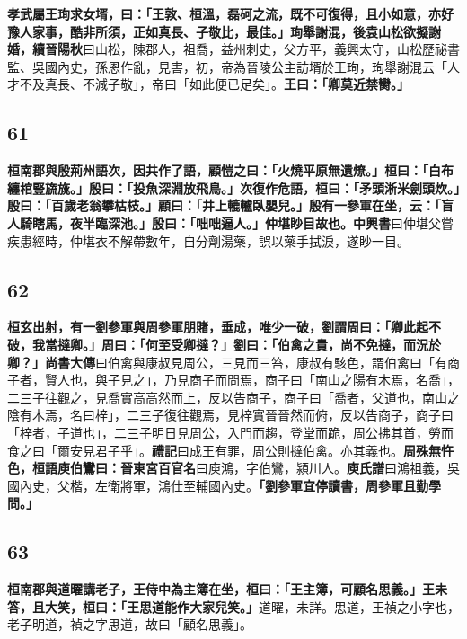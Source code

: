 \textbf{孝武屬王珣求女壻，曰：「王敦、桓溫，磊砢之流，既不可復得，且小如意，亦好豫人家事，酷非所須，正如真長、子敬比，最佳。」珣舉謝混，後袁山松欲擬謝婚，}{\footnotesize \textbf{續晉陽秋}曰山松，陳郡人，祖喬，益州刺史，父方平，義興太守，山松歷祕書監、吳國內史，孫恩作亂，見害，初，帝為晉陵公主訪壻於王珣，珣舉謝混云「人才不及真長、不減子敬」，帝曰「如此便已足矣」。}\textbf{王曰：「卿莫近禁臠。」}

\subsection*{61}

\textbf{桓南郡與殷荊州語次，因共作了語，顧愷之曰：「火燒平原無遺燎。」桓曰：「白布纏棺豎旒旐。」殷曰：「投魚深淵放飛鳥。」次復作危語，桓曰：「矛頭淅米劍頭炊。」殷曰：「百歲老翁攀枯枝。」顧曰：「井上轆轤臥嬰兒。」殷有一參軍在坐，云：「盲人騎瞎馬，夜半臨深池。」殷曰：「咄咄逼人。」仲堪眇目故也。}{\footnotesize \textbf{中興書}曰仲堪父嘗疾患經時，仲堪衣不解帶數年，自分劑湯藥，誤以藥手拭淚，遂眇一目。}

\subsection*{62}

\textbf{桓玄出射，有一劉參軍與周參軍朋賭，垂成，唯少一破，劉謂周曰：「卿此起不破，我當撻卿。」周曰：「何至受卿撻？」劉曰：「伯禽之貴，尚不免撻，而況於卿？」}{\footnotesize \textbf{尚書大傳}曰伯禽與康叔見周公，三見而三笞，康叔有駭色，謂伯禽曰「有商子者，賢人也，與子見之」，乃見商子而問焉，商子曰「南山之陽有木焉，名喬」，二三子往觀之，見喬實高高然而上，反以告商子，商子曰「喬者，父道也，南山之陰有木焉，名曰梓」，二三子復往觀焉，見梓實晉晉然而俯，反以告商子，商子曰「梓者，子道也」，二三子明日見周公，入門而趨，登堂而跪，周公拂其首，勞而食之曰「爾安見君子乎」。\textbf{禮記}曰成王有罪，周公則撻伯禽。亦其義也。}\textbf{周殊無忤色，桓語庾伯鸞曰：}{\footnotesize \textbf{晉東宮百官名}曰庾鴻，字伯鸞，潁川人。\textbf{庾氏譜}曰鴻祖義，吳國內史，父楷，左衛將軍，鴻仕至輔國內史。}\textbf{「劉參軍宜停讀書，周參軍且勤學問。」}

\subsection*{63}

\textbf{桓南郡與道曜講老子，王侍中為主簿在坐，桓曰：「王主簿，可顧名思義。」王未答，且大笑，桓曰：「王思道能作大家兒笑。」}{\footnotesize 道曜，未詳。思道，王禎之小字也，老子明道，禎之字思道，故曰「顧名思義」。}

